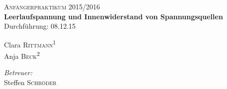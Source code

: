 \begin{titlepage}
\ \\
[1cm]
	\par
	\hfill
	\par
\begin{center}
\ \\
[5cm]	
	\textsc{\Huge Anfängerpraktikum 2015/2016} \\
[2cm]
	\Huge\textbf{Leerlaufspannung und Innenwiderstand von Spannungsquellen} \\
[1cm]
	{\large Durchführung: 08.12.15} \\
[4cm]
\begin{minipage}{0.4\textwidth}
	\begin{flushleft} \large
		Clara \textsc{Rittmann}\textsuperscript{1} \\
		Anja \textsc{Beck}\textsuperscript{2}
	\end{flushleft}
\end{minipage}
\hfill
\begin{minipage}{0.4\textwidth}
	\begin{flushright} \large
		\emph{Betreuer:} \\
		Steffen \textsc{Schröder}
	\end{flushright}
\end{minipage}
\end{center}
\end{titlepage}